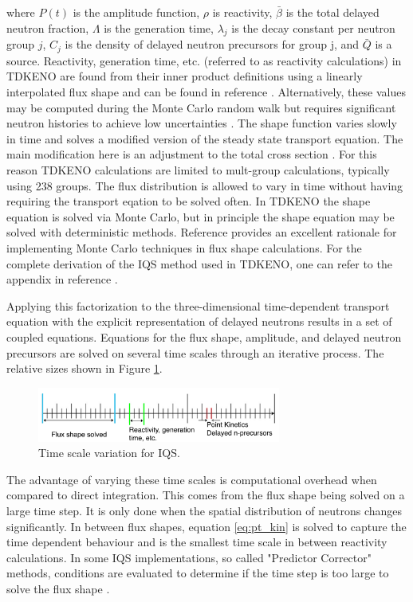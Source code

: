 \documentclass{anstrans}
\begin{document}
where $P(t)$ is the amplitude function, $\rho$ is reactivity, $\bar{\beta}$ is the total delayed neutron fraction, $\Lambda$ is the generation time, $\lambda_j$ is the decay constant per neutron group $j$, $C_j$ is the density of delayed neutron precursors for group j, and $\bar{Q}$ is a source.  
 Reactivity, generation time, etc. (referred to as reactivity calculations) in TDKENO are found from their inner product definitions using a linearly interpolated flux shape and can be found in reference \cite{Bentley}.  Alternatively, these values may be computed during the Monte Carlo random walk but requires significant neutron histories to achieve low uncertainties \cite{Waddell}.  The shape function varies slowly in time and solves a modified version of the steady state transport equation.  The main modification here is an adjustment to the total cross section \cite{Bentley}\cite{Gehin}.  For this reason TDKENO calculations are limited to mult-group calculations, typically using 238 groups.  The flux distribution is allowed to vary in time without having requiring the transport eqation to be solved often.  In TDKENO the shape equation is solved via Monte Carlo, but in principle the shape equation may be solved with deterministic methods.  Reference \cite{Shayesteh} provides an excellent rationale for implementing Monte Carlo techniques in flux shape calculations.  For the complete derivation of the IQS method used in TDKENO, one can refer to the appendix in reference \cite{Bentley}. 

Applying this factorization to the three-dimensional time-dependent transport equation with the explicit representation of delayed neutrons results in a set of coupled equations.  Equations for the flux shape, amplitude, and delayed neutron precursors are solved on several time scales through an iterative process. The relative sizes shown in Figure \ref{fig:time_scale}. 

\begin{figure}[h]
    \centering
    \includegraphics[width=8cm]{figures/time_scale.pdf}
    \caption{Time scale variation for IQS.}
    \label{fig:time_scale}
\end{figure}

The advantage of varying these time scales is computational overhead when compared to direct integration.  This comes from the flux shape being solved on a large time step. It is only done when the spatial distribution of neutrons changes significantly.  In between flux shapes, equation \ref{eq:pt_kin} is solved to capture the time dependent behaviour and is the smallest time scale in between reactivity calculations.  In some IQS implementations, so called "Predictor Corrector" methods, conditions are evaluated to determine if the time step is too large to solve the flux shape \cite{Dulla}.  
\end{document}
